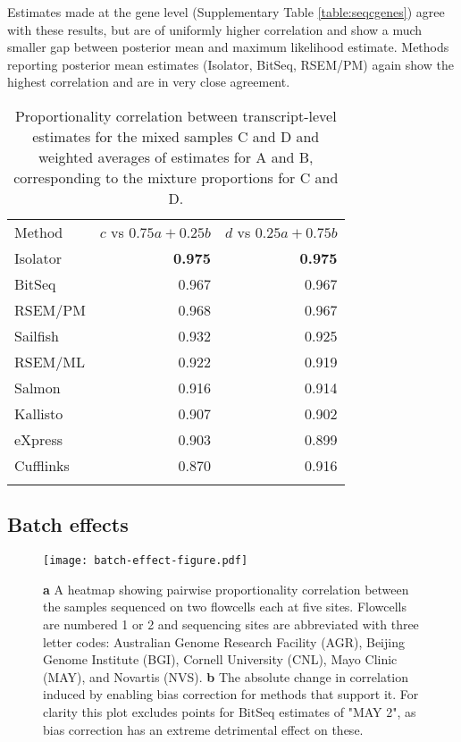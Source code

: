\documentclass[twocolumn]{article}
\begin{document}
Estimates made at the gene level (Supplementary Table \ref{table:seqcgenes})
agree with these results, but are of uniformly higher correlation and show a
much smaller gap between posterior mean and maximum likelihood estimate.
Methods reporting posterior mean estimates (Isolator, BitSeq, RSEM/PM) again
show the highest correlation and are in very close agreement.

\begin{table}\begin{tabular}[c]{@{}lrr@{}}
\toprule\addlinespace
Method & $c$ vs $0.75a + 0.25b$ & $d$ vs $0.25a + 0.75b$
\\\addlinespace
\midrule
Isolator & \textbf{0.975} & \textbf{0.975}
\\\addlinespace
BitSeq & 0.967 & 0.967
\\\addlinespace
RSEM/PM & 0.968 & 0.967
\\\addlinespace
Sailfish & 0.932 & 0.925
\\\addlinespace
RSEM/ML & 0.922 & 0.919
\\\addlinespace
Salmon & 0.916 & 0.914
\\\addlinespace
Kallisto & 0.907 & 0.902
\\\addlinespace
eXpress & 0.903 & 0.899
\\\addlinespace
Cufflinks & 0.870 & 0.916
\\\addlinespace
\bottomrule
\addlinespace
\end{tabular}
\caption{Proportionality correlation between transcript-level estimates
for the mixed samples C and D and weighted averages of estimates for A
and B, corresponding to the mixture proportions for C and D.}
\label{table:seqctranscripts}
\end{table}


\subsection{Batch effects}\label{batch-effects}

\begin{figure*}
\texttt{[image: batch-effect-figure.pdf]}
\caption{
\textbf{a} A heatmap showing pairwise proportionality correlation between the
samples sequenced on two flowcells each at five sites. Flowcells are numbered 1
or 2 and sequencing sites are abbreviated with three letter codes: Australian
Genome Research Facility (AGR), Beijing Genome Institute (BGI), Cornell
University (CNL), Mayo Clinic (MAY), and Novartis (NVS). \textbf{b} The absolute
change in correlation induced by enabling bias correction for methods that
support it. For clarity this plot excludes points for BitSeq estimates of "MAY
2", as bias correction has an extreme detrimental effect on these.}
\label{fig:batcheffects}
\end{figure*}
\end{document}
